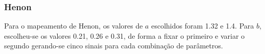 \begin{figure}[ht!]
	\vspace{0mm}	%
	\vspace{-2mm}	%
	\label{ex4_fig1}
\end{figure}


\clearpage
\subsubsection*{Henon}
Para o mapeamento de Henon, os valores de $a$ escolhidos foram 1.32 e 1.4. Para $b$, escolheu-se os valores 0.21, 0.26 e 0.31, de forma a fixar o primeiro e variar o segundo gerando-se cinco sinais para cada combinação de parâmetros.


